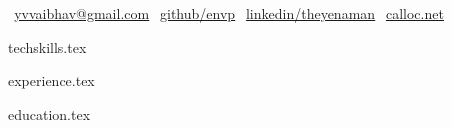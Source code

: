 \documentclass{resume} %
\newcommand*{\sectiondir}{_parts/}
\begin{document}
% 
%
{\centering
{}\selectfont
\hfill
\faEnvelope$~~$\underline{\href{mailto://yvvaibhav@gmail.com}{yvvaibhav@gmail.com}}
\hfill
\faGithub$~~$\underline{\href{https://github.com/envp}{github/envp}}
\hfill
\faLinkedinSquare$~~$\underline{\href{https://www.linkedin.com/in/theyenaman}{linkedin/theyenaman}}
\hfill
\faLink$~~$\underline{\href{https://calloc.net}{calloc.net}}
\par
\vspace{-0.5em}
}

%
%
{techskills.tex}

%
%
{experience.tex}

%
%
{education.tex}
\end{document}
